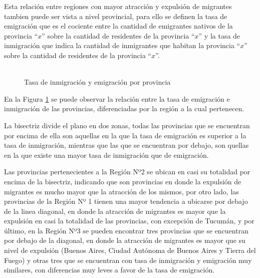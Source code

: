 \documentclass[12pt,a4paper]{article}
\begin{document}
Esta relación entre regiones con mayor atracción y expulsión de migrantes tambien puede ser vista a nivel provincial, para ello se definen la tasa de emigración que es el cociente entre la cantidad de emigrantes nativos de la provincia ``$x$'' sobre la cantidad de residentes de la provincia ``$x$'' y la tasa de inmigración que indica la cantidad de inmigrantes que habitan la provincia ``$x$'' sobre la cantidad de residentes de la provincia ``$x$''.

\begin{figure}[h!]
\begin{center}
\caption{\\Tasa de inmigración y emigración por provincia}

\label{figure:emig_inmig_prov}
\end{center}
\end{figure}
\newpage
En la Figura \ref{figure:emig_inmig_prov} se puede observar la relación entre la tasa de emigración e inmigración de las provincias, diferenciadas por la región a la cual pertenecen.

La bisectriz divide el plano en dos zonas, todas las provincias que se encuentran por encima de ella son aquellas en la que la tasa de emigración es superior a la tasa de inmigración, mientras que las que se encuentran por debajo, son quellas en la que existe una mayor tasa de inmigración que de emigración. 

Las provincias pertenecientes a la Región Nº2 se ubican en casi su totalidad por encima de la bisectriz, indicando que son provincias en donde la expulsión de migrantes es mucho mayor que la atracción de los mismos, por otro lado, las provincias de la Región Nº 1 tienen una mayor tendencia a ubicarse por debajo de la linea diagonal, en donde la atracción de migrantes es mayor que la expulsión en casi la totalidad de las provincias, con excepción de Tucumán, y por último, en la Región Nº3 se pueden encontrar tres provincias que se encuentran por debajo de la diagonal, en donde la atracción de migrantes es mayor que su nivel de expulsión (Buenos Aires, Ciudad Autónoma de Buenos Aires y Tierra del Fuego) y otras tres que se encuentran con tasa de inmigración y emigración muy similares, con diferencias muy leves a favor de la tasa de emigración.
\end{document}
